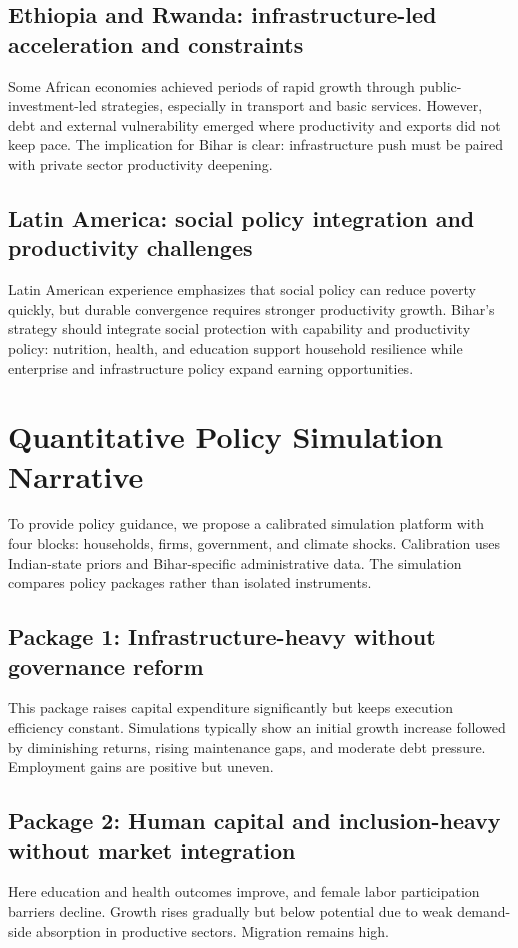 \documentclass[preprint,12pt]{elsarticle}
\begin{document}
\subsection{Ethiopia and Rwanda: infrastructure-led acceleration and constraints}
Some African economies achieved periods of rapid growth through public-investment-led strategies, especially in transport and basic services. However, debt and external vulnerability emerged where productivity and exports did not keep pace. The implication for Bihar is clear: infrastructure push must be paired with private sector productivity deepening.

\subsection{Latin America: social policy integration and productivity challenges}
Latin American experience emphasizes that social policy can reduce poverty quickly, but durable convergence requires stronger productivity growth. Bihar's strategy should integrate social protection with capability and productivity policy: nutrition, health, and education support household resilience while enterprise and infrastructure policy expand earning opportunities.

\section{Quantitative Policy Simulation Narrative}
To provide policy guidance, we propose a calibrated simulation platform with four blocks: households, firms, government, and climate shocks. Calibration uses Indian-state priors and Bihar-specific administrative data. The simulation compares policy packages rather than isolated instruments.

\subsection{Package 1: Infrastructure-heavy without governance reform}
This package raises capital expenditure significantly but keeps execution efficiency constant. Simulations typically show an initial growth increase followed by diminishing returns, rising maintenance gaps, and moderate debt pressure. Employment gains are positive but uneven.

\subsection{Package 2: Human capital and inclusion-heavy without market integration}
Here education and health outcomes improve, and female labor participation barriers decline. Growth rises gradually but below potential due to weak demand-side absorption in productive sectors. Migration remains high.
\end{document}
